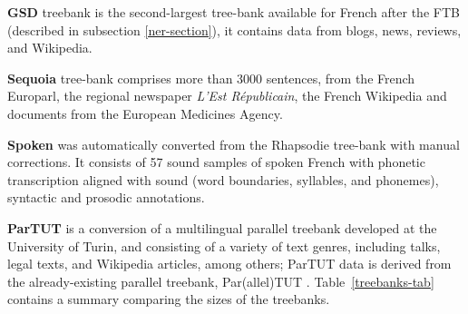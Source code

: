 \textbf{GSD} treebank \citep{mcdonald-etal-2013-universal} is the second-largest tree-bank available for French after the FTB (described in subsection \ref{ner-section}), it contains data from blogs, news, reviews, and Wikipedia.

\textbf{Sequoia} tree-bank \citep{candito-etal-2014-deep} comprises more than 3000 sentences, from the French Europarl, the regional newspaper \emph{L’Est Républicain}, the French Wikipedia and documents from the European Medicines Agency.

\textbf{Spoken} was automatically converted from the Rhapsodie tree-bank \citep{lacheret-etal-2014-rhapsodie} with manual corrections. It consists of 57 sound samples of spoken French with phonetic transcription aligned with sound (word boundaries, syllables, and phonemes), syntactic and prosodic annotations.

\textbf{ParTUT} is a conversion of a multilingual parallel treebank developed at the University of Turin, and consisting of a variety of text genres, including talks, legal texts, and Wikipedia articles, among others; ParTUT data is derived from the already-existing parallel treebank, Par(allel)TUT \citep{sanguinetti-Bosco-2015-parttut}. Table~\ref{treebanks-tab} contains a summary comparing the sizes of the treebanks.


